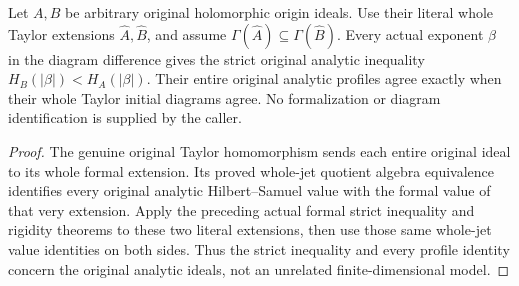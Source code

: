 \begin{corollary}
\label{hir:actual-original-taylor-diagram-strict-hs-drop}
\leanok
Let $A,B$ be arbitrary original holomorphic origin ideals. Use their
literal whole Taylor extensions $\widehat A,\widehat B$, and assume
$\Gamma(\widehat A)\subseteq\Gamma(\widehat B)$. Every actual exponent
$\beta$ in the diagram difference gives the strict original analytic
inequality $H_B(|\beta|)<H_A(|\beta|)$. Their entire original analytic
profiles agree exactly when their whole Taylor initial diagrams agree.
No formalization or diagram identification is supplied by the caller.
\end{corollary}
\begin{proof}
The genuine original Taylor homomorphism sends each entire original
ideal to its whole formal extension. Its proved whole-jet quotient
algebra equivalence identifies every original analytic
Hilbert--Samuel value with the formal value of that very extension.
Apply the preceding actual formal strict inequality and rigidity
theorems to these two literal extensions, then use those same
whole-jet value identities on both sides. Thus the strict inequality
and every profile identity concern the original analytic ideals,
not an unrelated finite-dimensional model.
\end{proof}
